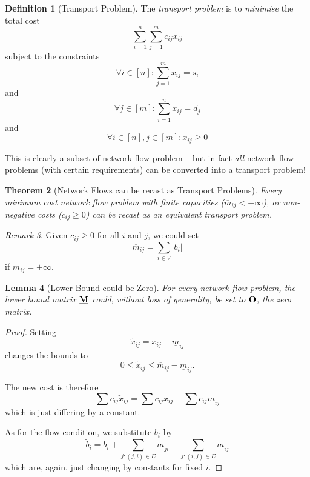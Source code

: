\documentclass[11pt]{article}
\newtheorem{theorem}{Theorem}[section]
\newtheorem{lemma}[theorem]{Lemma}
\theoremstyle{definition}
\newtheorem{definition}[theorem]{Definition}
\theoremstyle{remark}
\newtheorem{remark}[theorem]{Remark}
\newcommand{\pqty}[1]{\left(#1\right)}
\newcommand{\bqty}[1]{\left[#1\right]}
\newcommand{\abs}[1]{\left|#1\right|}
\newcommand{\plusinfty}{+\infty}
\begin{document}
\begin{definition}[Transport Problem]\label{optim-unit-0069}
    The \emph{transport problem} is to \emph{minimise} the total cost
    \[
        \sum_{i = 1}^{n} \sum_{j = 1}^{m} c_{ij} x_{ij}
    \]
    subject to the constraints
    \[
        \forall i \in \bqty{n}: \sum_{j = 1}^{m} x_{ij} = s_i
    \]
    and
    \[
        \forall j \in \bqty{m}: \sum_{i = 1}^{n} x_{ij} = d_j
    \]
    and
    \[
        \forall i \in \bqty{n}, j \in \bqty{m}: x_{ij} \geq 0
    \]  
\end{definition}

This is clearly a subset of network flow problem -- but in fact \emph{all} network flow problems (with certain requirements) can be converted into a transport problem!

\begin{theorem}[Network Flows can be recast as Transport Problems]\label{optim-unit-0070}
    \label{thm:network-flow-recast-transport}%
    Every minimum cost network flow problem with finite capacities (\(\overline{m}_{ij} < \plusinfty\)), or non-negative costs (\(c_{ij} \geq 0\)) can be recast as an equivalent transport problem.
\end{theorem}

\begin{remark}\label{optim-unit-0071}
    Given \(c_{ij} \geq 0\) for all \(i\) and \(j\), we could set
    \[
        \overline{m}_{ij} = \sum_{i \in V} \abs{b_i}
    \]
    if \(\overline{m}_{ij} = \plusinfty\).
\end{remark}

\begin{lemma}[Lower Bound could be Zero]\label{optim-unit-0072}
    For every network flow problem, the lower bound matrix \(\underline{\vb{M}}\) could, without loss of generality, be set to \(\vb{O}\), the zero matrix.
\end{lemma}

\begin{proof}
    Setting
    \[
        \tilde{x}_{ij} = x_{ij} - \underline{m}_{ij}
    \]
    changes the bounds to
    \[
        0 \leq \tilde{x}_{ij} \leq \overline{m}_{ij} - \underline{m}_{ij}.
    \]

    The new cost is therefore
    \[
        \sum c_{ij} \tilde{x}_{ij} = \sum c_{ij} x_{ij} - \sum c_{ij} \underline{m}_{ij}
    \]
    which is just differing by a constant.

    As for the flow condition, we substitute \(b_i\) by
    \[
        \tilde{b}_i = b_i + \sum_{j: \pqty{j, i} \in E} \underline{m}_{ji} - \sum_{j: \pqty{i, j} \in E} \underline{m}_{ij}
    \]
    which are, again, just changing by constants for fixed \(i\).
\end{proof}
\end{document}
